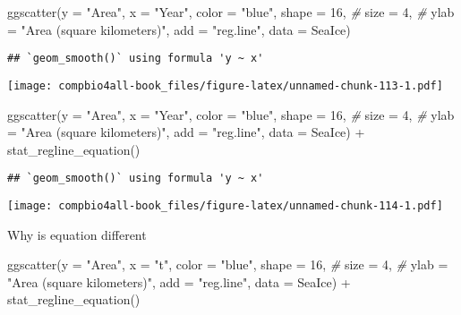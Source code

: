\documentclass[
]{book}
\newenvironment{Shaded}{\begin{snugshade}}{\end{snugshade}}
\newcommand{\AttributeTok}[1]{\textcolor[rgb]{0.77,0.63,0.00}{#1}}
\newcommand{\CommentTok}[1]{\textcolor[rgb]{0.56,0.35,0.01}{\textit{#1}}}
\newcommand{\DecValTok}[1]{\textcolor[rgb]{0.00,0.00,0.81}{#1}}
\newcommand{\FunctionTok}[1]{\textcolor[rgb]{0.00,0.00,0.00}{#1}}
\newcommand{\NormalTok}[1]{#1}
\newcommand{\SpecialCharTok}[1]{\textcolor[rgb]{0.00,0.00,0.00}{#1}}
\newcommand{\StringTok}[1]{\textcolor[rgb]{0.31,0.60,0.02}{#1}}
\begin{document}
\begin{Shaded}
\begin{Highlighting}[]
\FunctionTok{ggscatter}\NormalTok{(}\AttributeTok{y =} \StringTok{"Area"}\NormalTok{,}
          \AttributeTok{x =} \StringTok{"Year"}\NormalTok{,}
          \AttributeTok{color =} \StringTok{"blue"}\NormalTok{,}
          \AttributeTok{shape =} \DecValTok{16}\NormalTok{,     }\CommentTok{\# }
          \AttributeTok{size =} \DecValTok{4}\NormalTok{,       }\CommentTok{\# }
          \AttributeTok{ylab =} \StringTok{"Area (square kilometers)"}\NormalTok{, }
          \AttributeTok{add =} \StringTok{"reg.line"}\NormalTok{,}
          \AttributeTok{data =}\NormalTok{ SeaIce)}
\end{Highlighting}
\end{Shaded}

\begin{verbatim}
## `geom_smooth()` using formula 'y ~ x'
\end{verbatim}

\texttt{[image: compbio4all-book\_files/figure-latex/unnamed-chunk-113-1.pdf]}

\begin{Shaded}
\begin{Highlighting}[]
\FunctionTok{ggscatter}\NormalTok{(}\AttributeTok{y =} \StringTok{"Area"}\NormalTok{,}
          \AttributeTok{x =} \StringTok{"Year"}\NormalTok{,}
          \AttributeTok{color =} \StringTok{"blue"}\NormalTok{,}
          \AttributeTok{shape =} \DecValTok{16}\NormalTok{,     }\CommentTok{\# }
          \AttributeTok{size =} \DecValTok{4}\NormalTok{,       }\CommentTok{\# }
          \AttributeTok{ylab =} \StringTok{"Area (square kilometers)"}\NormalTok{, }
          \AttributeTok{add =} \StringTok{"reg.line"}\NormalTok{,}
          \AttributeTok{data =}\NormalTok{ SeaIce) }\SpecialCharTok{+}
  \FunctionTok{stat\_regline\_equation}\NormalTok{()}
\end{Highlighting}
\end{Shaded}

\begin{verbatim}
## `geom_smooth()` using formula 'y ~ x'
\end{verbatim}

\texttt{[image: compbio4all-book\_files/figure-latex/unnamed-chunk-114-1.pdf]}

Why is equation different

\begin{Shaded}
\begin{Highlighting}[]
\FunctionTok{ggscatter}\NormalTok{(}\AttributeTok{y =} \StringTok{"Area"}\NormalTok{,}
          \AttributeTok{x =} \StringTok{"t"}\NormalTok{,}
          \AttributeTok{color =} \StringTok{"blue"}\NormalTok{,}
          \AttributeTok{shape =} \DecValTok{16}\NormalTok{,     }\CommentTok{\# }
          \AttributeTok{size =} \DecValTok{4}\NormalTok{,       }\CommentTok{\# }
          \AttributeTok{ylab =} \StringTok{"Area (square kilometers)"}\NormalTok{, }
          \AttributeTok{add =} \StringTok{"reg.line"}\NormalTok{,}
          \AttributeTok{data =}\NormalTok{ SeaIce) }\SpecialCharTok{+}
  \FunctionTok{stat\_regline\_equation}\NormalTok{()}
\end{Highlighting}
\end{Shaded}
\end{document}
